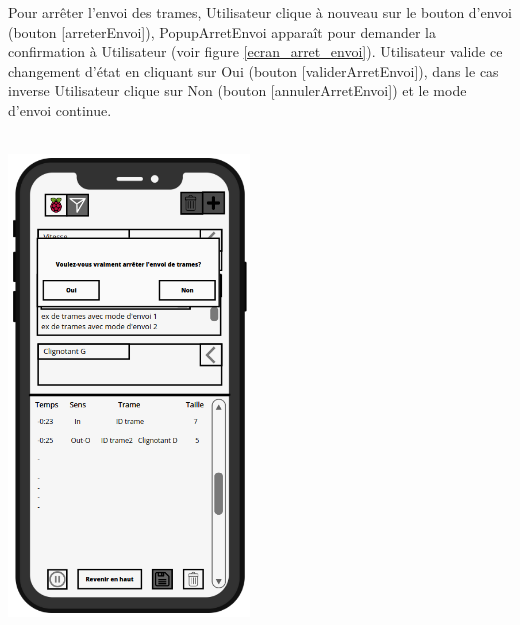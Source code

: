 \newpage
Pour arrêter l'envoi des trames, Utilisateur clique à nouveau sur le bouton d'envoi (bouton [arreterEnvoi]), PopupArretEnvoi apparaît pour demander la confirmation à Utilisateur (voir figure \ref{ecran_arret_envoi}). Utilisateur valide ce changement d'état en cliquant sur {\guillemetleft} Oui {\guillemetright} (bouton [validerArretEnvoi]), dans le cas inverse Utilisateur clique sur {\guillemetleft} Non {\guillemetright} (bouton [annulerArretEnvoi]) et le mode d'envoi continue. 
\\\\
\begin{minipage}{1\linewidth}
    \centering
    \includegraphics[width=0.48\textwidth]{sections/3_Exigences_specifiques/1_IHM/ihm/ecranArretEnvoi.png}
    \label{ecran_arret_envoi}
\end{minipage}\hfill

